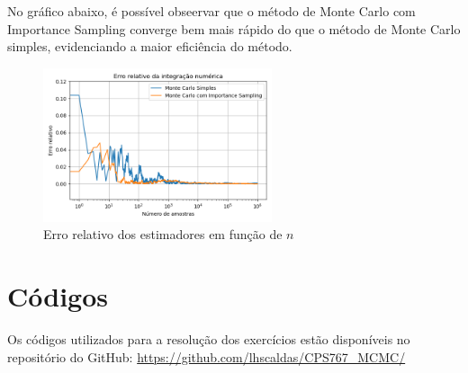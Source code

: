 \documentclass[12 pt]{article}
\begin{document}
\begin{enumerate}
\begin{tcolorbox}[colframe=black, title=Resposta:]
    \end{tcolorbox}

    \begin{tcolorbox}[colframe=black, title=Resposta (continuação):]
        No gráfico abaixo, é possível obseervar que o método de Monte Carlo com Importance Sampling converge bem mais rápido do que o método de Monte Carlo simples, evidenciando a maior eficiência do método.
    \end{tcolorbox}

    \begin{figure}[H]
        \centering
        \includegraphics[width=0.6\textwidth]{q9.png}
        \caption{Erro relativo dos estimadores em função de $n$}
        \label{fig:erro_estimadores}
    \end{figure}





\end{enumerate}


\section*{Códigos}

Os códigos utilizados para a resolução dos exercícios estão disponíveis no repositório do GitHub: \url{https://github.com/lhscaldas/CPS767_MCMC/}

\end{document}

